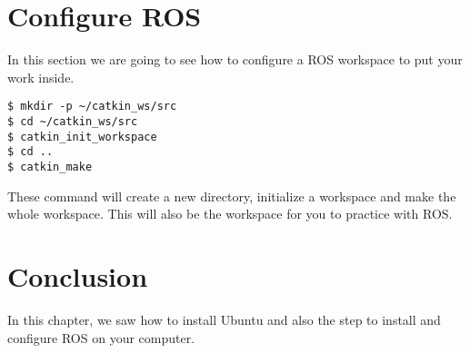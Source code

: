 \newpage

\section{Configure ROS}

In this section we are going to see how to configure a ROS workspace to put your work inside.

\begin{lstlisting}[breaklines=True language=bash]
$ mkdir -p ~/catkin_ws/src
$ cd ~/catkin_ws/src
$ catkin_init_workspace
$ cd ..
$ catkin_make
\end{lstlisting}
These command will create a new directory, initialize a workspace and make the whole workspace. This will also be the workspace for you to practice with ROS.
\newpage

\section{Conclusion}
In this chapter, we saw how to install Ubuntu and also the step to install and configure ROS on your computer.